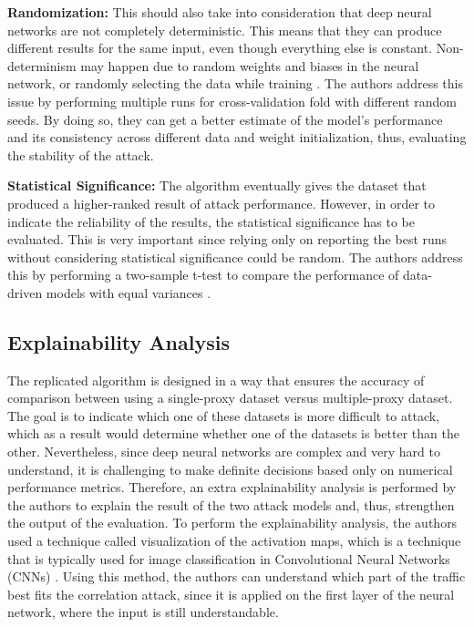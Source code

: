 \documentclass[sigconf]{acmart}
\begin{document}
\textbf{Randomization:} This should also take into consideration that deep neural networks are not completely deterministic. This means that they can produce different results for the same input, even though everything else is constant. Non-determinism may happen due to random weights and biases in the neural network, or randomly selecting the data while training \cite{Randomness}. The authors address this issue by performing multiple runs for cross-validation fold with different random seeds. By doing so, they can get a better estimate of the model's performance and its consistency across different data and weight initialization, thus, evaluating the stability of the attack. 

\vspace{3mm}

\textbf{Statistical Significance:} The algorithm eventually gives the dataset that produced a higher-ranked result of attack performance. However, in order to indicate the reliability of the results, the statistical significance has to be evaluated. This is very important since relying only on reporting the best runs without considering statistical significance could be random. The authors address this by performing a two-sample t-test to compare the performance of data-driven models with equal variances \cite{StatisticalSignificance}.



\subsection{Explainability Analysis} \label{6.3}

The replicated algorithm is designed in a way that ensures the accuracy of comparison between using a single-proxy dataset versus multiple-proxy dataset. The goal is to indicate which one of these datasets is more difficult to attack, which as a result would determine whether one of the datasets is better than the other. Nevertheless, since deep neural networks are complex and very hard to understand, it is challenging to make definite decisions based only on numerical performance metrics. Therefore, an extra explainability analysis is performed by the authors to explain the result of the two attack models and, thus, strengthen the output of the evaluation. To perform the explainability analysis, the authors used a technique called visualization of the activation maps, which is a technique that is typically used for image classification in Convolutional Neural Networks (CNNs) \cite{ConvolutionalNetworks}. Using this method, the authors can understand which part of the traffic best fits the correlation attack, since it is applied on the first layer of the neural network, where the input is still understandable.
\end{document}
